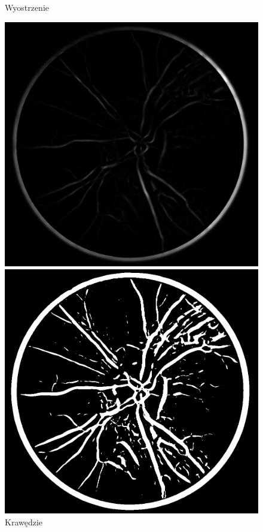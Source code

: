 \documentclass[polish,polish,a4paper]{article}
\begin{document}
\begin{figure}[!h]
\begin{minipage}{0.3\linewidth}
				\caption*{Wyostrzenie}
			\end{minipage}
			\begin{minipage}{0.3\linewidth}
				\includegraphics[width=\linewidth]{./dane/metoda1/edges.png}
				\caption*{Krawędzie}
			\end{minipage}
			\begin{minipage}{0.3\linewidth}
				\includegraphics[width=\linewidth]{./dane/metoda1/binary.png}

\end{minipage}
\end{figure}
\end{document}
